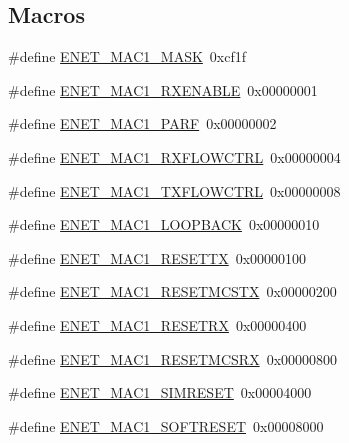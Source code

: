 \subsection*{Macros}
\begin{DoxyCompactItemize}
\item 
\#define \hyperlink{group__ENET__17XX__40XX_gadc9dc4a912f946aef0f397e01c745e23}{E\-N\-E\-T\-\_\-\-M\-A\-C1\-\_\-\-M\-A\-S\-K}~0xcf1f
\item 
\#define \hyperlink{group__ENET__17XX__40XX_ga1c0b1a53b97bbb37a634729dbb1f7c64}{E\-N\-E\-T\-\_\-\-M\-A\-C1\-\_\-\-R\-X\-E\-N\-A\-B\-L\-E}~0x00000001
\item 
\#define \hyperlink{group__ENET__17XX__40XX_ga4c1b1afa07ca17af9a536e55b5214651}{E\-N\-E\-T\-\_\-\-M\-A\-C1\-\_\-\-P\-A\-R\-F}~0x00000002
\item 
\#define \hyperlink{group__ENET__17XX__40XX_ga715c51b94b6651715bec8a58d63ede58}{E\-N\-E\-T\-\_\-\-M\-A\-C1\-\_\-\-R\-X\-F\-L\-O\-W\-C\-T\-R\-L}~0x00000004
\item 
\#define \hyperlink{group__ENET__17XX__40XX_ga9621f7d3f1df5610f251f74a90d4bfd9}{E\-N\-E\-T\-\_\-\-M\-A\-C1\-\_\-\-T\-X\-F\-L\-O\-W\-C\-T\-R\-L}~0x00000008
\item 
\#define \hyperlink{group__ENET__17XX__40XX_ga5d10c874131056c389ecb1357be5e7a2}{E\-N\-E\-T\-\_\-\-M\-A\-C1\-\_\-\-L\-O\-O\-P\-B\-A\-C\-K}~0x00000010
\item 
\#define \hyperlink{group__ENET__17XX__40XX_gaf1ab84b82270514182f96bf19db18b38}{E\-N\-E\-T\-\_\-\-M\-A\-C1\-\_\-\-R\-E\-S\-E\-T\-T\-X}~0x00000100
\item 
\#define \hyperlink{group__ENET__17XX__40XX_ga929295618f7227006918b172c37274ba}{E\-N\-E\-T\-\_\-\-M\-A\-C1\-\_\-\-R\-E\-S\-E\-T\-M\-C\-S\-T\-X}~0x00000200
\item 
\#define \hyperlink{group__ENET__17XX__40XX_ga08220afd93ff8aaee439369cbda83d55}{E\-N\-E\-T\-\_\-\-M\-A\-C1\-\_\-\-R\-E\-S\-E\-T\-R\-X}~0x00000400
\item 
\#define \hyperlink{group__ENET__17XX__40XX_gaededc9960450035cfa31578c67d9765a}{E\-N\-E\-T\-\_\-\-M\-A\-C1\-\_\-\-R\-E\-S\-E\-T\-M\-C\-S\-R\-X}~0x00000800
\item 
\#define \hyperlink{group__ENET__17XX__40XX_gad1496577c2254ab94911ee01420744ea}{E\-N\-E\-T\-\_\-\-M\-A\-C1\-\_\-\-S\-I\-M\-R\-E\-S\-E\-T}~0x00004000
\item 
\#define \hyperlink{group__ENET__17XX__40XX_ga7b0dd5ccbaca44db89764a33f221b225}{E\-N\-E\-T\-\_\-\-M\-A\-C1\-\_\-\-S\-O\-F\-T\-R\-E\-S\-E\-T}~0x00008000
\item 

\end{DoxyCompactItemize}
